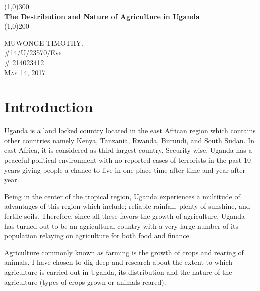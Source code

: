 \documentclass{article}
\begin{document}
\begin{titlepage}
	\begin{center}
	\line(1,0){300}\\
	[0.25inc]
	\huge{\bfseries The Destribution and Nature of Agriculture in Uganda}\\
	[2mm]
	\line(1,0){200}\\
	[1.5cm]
	\end{center}

	\begin{flushright}
	\textsc{\large MUWONGE TIMOTHY.\\
	\#14/U/23570/Eve \\
	\# 214023412\\
	May 14, 2017\\}
	\end{flushright}
\end{titlepage}

\cleardoublepage

\tableofcontents
\thispagestyle{empty}
\cleardoublepage
{}
\setcounter{page}{1}

\section{Introduction}\label{sec:intro}
Uganda is a land locked country located in the east African region which contains other countries namely Kenya, Tanzania, Rwanda, Burundi, and South Sudan. In east Africa, it is considered as third largest country. Security wise, Uganda has a peaceful political environment with no reported cases of terrorists in the past 10 years giving people a chance to live in one place time after time and year after year.

Being in the center of the tropical region, Uganda experiences a multitude of advantages of this region which include; reliable rainfall, plenty of sunshine, and fertile soils. Therefore, since all these favors the growth of agriculture, Uganda has turned out to be an agricultural country with a very large number of its population relaying on agriculture for both food and finance.

Agriculture commonly known as farming is the growth of crops and rearing of animals. I have chosen to dig deep and research about the extent to which agriculture is carried out in Uganda, its distribution and the nature of the agriculture (types of crops grown or animals reared).
\end{document}
